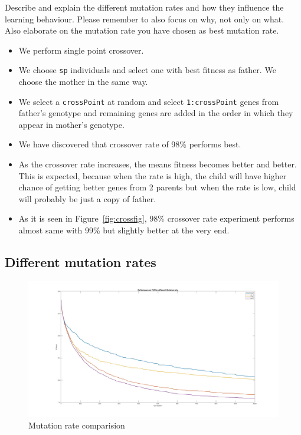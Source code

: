 \documentclass[a4paper, 12pt]{article}
\begin{document}
Describe and explain the different mutation rates and how they influence the learning behaviour. Please remember to also focus on why, not only on what.
Also elaborate on the mutation rate you have chosen as best mutation rate.
\begin{itemize}
    \item We perform single point crossover.
    \item We choose \texttt{sp} individuals and select one with best fitness as father. We choose the mother in the same way.
    \item We select a \texttt{crossPoint} at random and select \texttt{1:crossPoint} genes from father's genotype and remaining genes are added in the order in which they appear in mother's genotype.
    \item We have discovered that crossover rate of 98\% performs best.
    \item As the crossover rate increases, the means fitness becomes better and better. This is expected, because when the rate is high, the child will have higher chance of getting better genes from 2 parents but when the rate is low, child will probably be just a copy of father.
    \item As it is seen in Figure~\ref{fig:crossfig}, 98\% crossover rate experiment performs almost same with 99\% but slightly better at the very end.
\end{itemize}

\newpage

\subsection{Different mutation rates}


\begin{figure}[ht!]
  \centering
  \includegraphics[width=1.0\textwidth]{images/mutation_exp_25.jpg}
    \caption{Mutation rate comparision\label{fig:mutfig}}
\end{figure}
\end{document}
